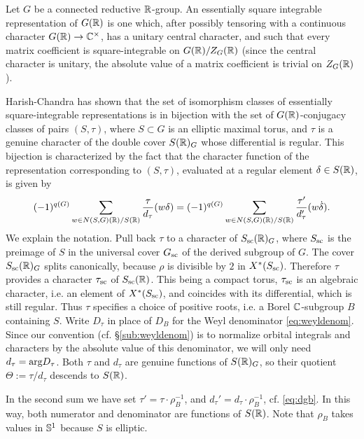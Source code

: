 \documentclass{article}
\theoremstyle{definition}
\numberwithin{equation}{section}
\renewcommand{\-}{\hyp{}}
\begin{document}
Let $G$ be a connected reductive $\mathbb{R}$-group. An essentially square integrable representation of $G(\mathbb{R})$ is one which, after possibly tensoring with a continuous character $G(\mathbb{R}) \to \mathbb{C}^\times$, has a unitary central character, and such that every matrix coefficient is square-integrable on $G(\mathbb{R})/Z_G(\mathbb{R})$ (since the central character is unitary, the absolute value of a matrix coefficient is trivial on $Z_G(\mathbb{R})$).

Harish-Chandra has shown that the set of isomorphism classes of essentially square-integrable representations is in bijection with the set of $G(\mathbb{R})$-conjugacy classes of pairs $(S,\tau)$, where $S \subset G$ is an elliptic maximal torus, and $\tau$ is a genuine character of the double cover $S(\mathbb{R})_G$ whose differential is regular. This bijection is characterized by the fact that the character function of the representation corresponding to $(S,\tau)$, evaluated at a regular element $\delta \in S(\mathbb{R})$, is given by
\begin{equation} \label{eq:charfmla}
(-1)^{q(G)}\sum_{w \in N(S,G)(\mathbb{R})/S(\mathbb{R})} \frac{\tau}{d_\tau}(w\delta) = (-1)^{q(G)}\sum_{w \in N(S,G)(\mathbb{R})/S(\mathbb{R})} \frac{\tau'}{d'_\tau}(w\dot\delta).
\end{equation}
We explain the notation. Pull back $\tau$ to a character of $S_{\textrm{sc}}(\mathbb{R})_G$, where $S_{\textrm{sc}}$ is the preimage of $S$ in the universal cover $G_{\textrm{sc}}$ of the derived subgroup of $G$. The cover $S_{\textrm{sc}}(\mathbb{R})_G$ splits canonically, because $\rho$ is divisible by $2$ in $X^*(S_{\textrm{sc}})$. Therefore $\tau$ provides a character $\tau_{\textrm{sc}}$ of $S_{\textrm{sc}}(\mathbb{R})$. This being a compact torus, $\tau_{\textrm{sc}}$ is an algebraic character, i.e. an element of $X^*(S_{\textrm{sc}})$, and coincides with its differential, which is still regular. Thus $\tau$ specifies a choice of positive roots, i.e. a Borel $\mathbb{C}$-subgroup $B$ containing $S$. Write $D_\tau$ in place of $D_B$ for the Weyl denominator \eqref{eq:weyldenom}. Since our convention (cf. \S\ref{sub:weyldenom}) is to normalize orbital integrals and characters by the absolute value of this denominator, we will only need $d_\tau=\textrm{arg}D_\tau$. Both $\tau$ and $d_\tau$ are genuine functions of $S(\mathbb{R})_G$, so their quotient $\Theta:=\tau/d_\tau$ descends to $S(\mathbb{R})$.

In the second sum we have set $\tau'=\tau \cdot \rho_B^{-1}$, and $d_\tau'=d_\tau \cdot \rho_B^{-1}$, cf. \eqref{eq:dgb}. In this way, both numerator and denominator are functions of $S(\mathbb{R})$. Note that $\rho_B$ takes values in $\mathbb{S}^1$ because $S$ is elliptic.
\end{document}
